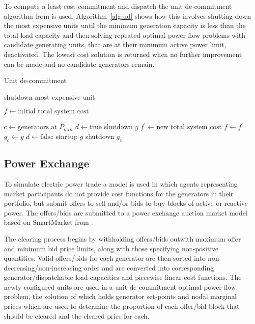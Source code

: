 To compute a least cost commitment and dispatch the unit de-commitment
algorithm from  is used.  Algorithm~\ref{alg:ud}
shows how this involves shutting down the most expensive units until the
minimum generation capacity is less than the total load capacity and then
solving repeated optimal power flow problems with candidate generating units,
that are at their minimum active power limit, deactivated.  The lowest cost
solution is returned when no further improvement can be made and no candidate
generators remain.

\begin{algorithm}%
\caption{Unit de-commitment}
\label{alg:ud}
\begin{algorithmic}[1]
	\STATE shutdown most expensive unit
\ENDWHILE

\STATE $f \leftarrow \text{initial total system cost}$

\REPEAT
	\STATE $c \leftarrow \text{generators at } P_{min}$
		\STATE $d \leftarrow \text{true}$
		\STATE shutdown $g$
		\STATE $f^\prime \leftarrow \text{new total system cost}$
			\STATE $f \leftarrow f^\prime$
			\STATE $g_{c} \leftarrow g$
			\STATE $d \leftarrow \text{false}$
		\ENDIF
		\STATE startup $g$
	\ENDFOR
	\STATE shutdown $g_c$
\end{algorithmic}
\end{algorithm}

\subsection{Power Exchange}
To simulate electric power trade a model is used in which agents representing
market participants do not provide cost functions for the generators in their portfolio, but submit
offers to sell and/or bids to buy blocks of active or reactive power.  The
offers/bids are submitted to a power exchange auction market model based on
SmartMarket from .

The clearing process begins by withholding
offers/bids outwith maximum offer and minimum bid price limits, along with
those specifying non-positive quantities. Valid offers/bids for each generator
are then sorted into non-decreasing/non-increasing order and are converted
into corresponding generator/dispatchable load capacities and piecewise linear
cost functions. The newly configured units are used in a unit de-commitment
optimal power flow problem, the solution of which holds generator set-points
and nodal marginal prices which are used to determine the proportion of each
offer/bid block that should be cleared and the cleared price for each.

